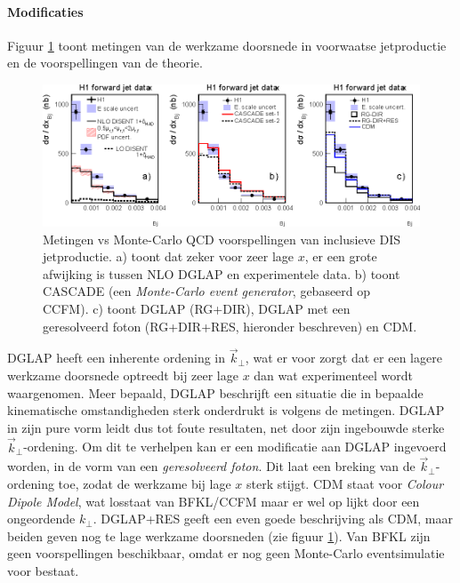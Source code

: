\documentclass[a4paper,11pt]{article}
\numberwithin{equation}{section} %
\begin{document}
       \paragraph{Modificaties}
Figuur \ref{fig:HERAJets1} toont metingen van de werkzame doorsnede in voorwaatse jetproductie en de voorspellingen van de theorie.
\begin{figure} [H]
  \begin{center}
    \includegraphics[scale=1]{Afbeeldingen/HERAJets1.eps}
    \caption{Metingen vs Monte-Carlo QCD voorspellingen van inclusieve DIS jetproductie. a) toont dat zeker voor zeer lage $x$, er een grote afwijking is tussen NLO DGLAP en experimentele data. b) toont CASCADE  (een \textit{Monte-Carlo event generator}, gebaseerd op CCFM). c) toont DGLAP (RG+DIR), DGLAP met een geresolveerd foton (RG+DIR+RES, hieronder beschreven) en CDM. \cite{Kiesling}}
   \label{fig:HERAJets1}
  \end{center}
\end{figure}
DGLAP heeft een inherente ordening in $\vec{k}_\perp$, wat er voor zorgt dat er een lagere werkzame doorsnede optreedt bij zeer lage $x$ dan wat experimenteel wordt waargenomen.
Meer bepaald, DGLAP beschrijft een situatie die in bepaalde kinematische omstandigheden \cite[sectie 3.2]{Kiesling} sterk onderdrukt is volgens de metingen.
DGLAP in zijn pure vorm leidt dus tot foute resultaten, net door zijn ingebouwde sterke $\vec{k}_\perp$-ordening.
Om dit te verhelpen kan er een modificatie aan DGLAP ingevoerd worden, in de vorm van een \textit{geresolveerd foton}.
Dit laat een breking van de $\vec{k}_\perp$-ordening toe, zodat de werkzame bij lage $x$ sterk stijgt.
CDM staat voor \textit{Colour Dipole Model}, wat losstaat van BFKL/CCFM maar er wel op lijkt door een ongeordende $k_\perp$.
DGLAP+RES geeft een even goede beschrijving als CDM, maar beiden geven nog te lage werkzame doorsneden (zie figuur \ref{fig:HERAJets1}).
Van BFKL zijn geen voorspellingen beschikbaar, omdat er nog geen Monte-Carlo eventsimulatie voor bestaat.
\end{document}
